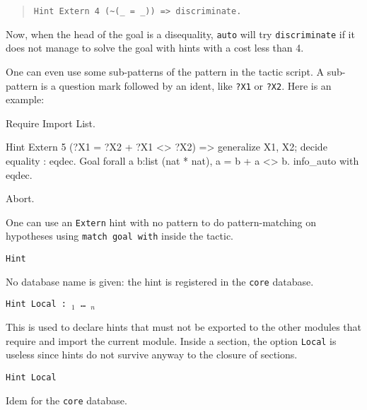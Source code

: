 \begin{coq_example*}
\begin{itemize}
\begin{quotation}
\begin{verbatim}
Hint Extern 4 (~(_ = _)) => discriminate.
\end{verbatim}
\end{quotation}

  Now, when the head of the goal is a disequality, \texttt{auto} will
  try \texttt{discriminate} if it does not manage to solve the goal
  with hints with a cost less than 4.

  One can even use some sub-patterns of the pattern in the tactic
  script. A sub-pattern is a question mark followed by an ident, like
  \texttt{?X1} or \texttt{?X2}. Here is an example:

\begin{coq_example*}
Require Import List.
\end{coq_example*}
\begin{coq_example}
Hint Extern 5   ({?X1 = ?X2} + {?X1 <> ?X2}) =>
 generalize X1, X2; decide equality : eqdec.
Goal
forall a b:list (nat * nat), {a = b} + {a <> b}.
info_auto with eqdec.
\end{coq_example}
\begin{coq_eval}
Abort.
\end{coq_eval}

\end{itemize}

\Rem One can use an \texttt{Extern} hint with no pattern to do
pattern-matching on hypotheses using \texttt{match goal with} inside
the tactic.

\begin{Variants}
\item {\tt Hint \hintdef}

  No database name is given: the hint is registered in the {\tt core}
    database.

\item {\tt Hint Local {\hintdef} : \ident$_1$ \mbox{\dots} \ident$_n$}

  This is used to declare hints that must not be exported to the other
  modules that require and import the current module. Inside a
  section, the option {\tt Local} is useless since hints do not
  survive anyway to the closure of sections.

\item {\tt Hint Local \hintdef}

  Idem for the {\tt core} database.

\end{Variants}


\end{coq_example*}
